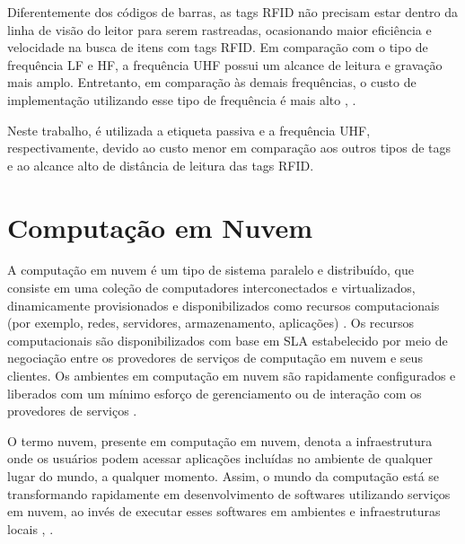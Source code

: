 
Diferentemente dos códigos de barras, as tags \acrshort{RFID} não precisam estar dentro da linha de visão do leitor para serem rastreadas, ocasionando maior eficiência e velocidade na busca de itens com tags \acrshort{RFID}. Em comparação com o tipo de frequência \acrshort{LF} e \acrshort{HF}, a frequência \acrshort{UHF} possui um alcance de leitura e gravação mais amplo. Entretanto, em comparação às demais frequências, o custo de implementação utilizando esse tipo de frequência é mais alto \cite{Bolic2010}, \cite{Juels2006RFIDSurvey}.

Neste trabalho, é utilizada a etiqueta passiva e a frequência \acrshort{UHF}, respectivamente, devido ao custo menor em comparação aos outros tipos de tags e ao alcance alto de distância de leitura das tags \acrshort{RFID}.

\section{Computação em Nuvem}
\label{sec:computação-nuvem}




A computação em nuvem é um tipo de sistema paralelo e distribuído, que consiste em uma coleção de computadores interconectados e virtualizados, dinamicamente provisionados e disponibilizados como recursos computacionais (por exemplo, redes, servidores, armazenamento, aplicações) \cite{Buyya2009}. Os recursos computacionais são disponibilizados com base em \acrshort{SLA} estabelecido por meio de negociação entre os provedores de serviços de computação em nuvem e seus clientes. Os ambientes em computação em nuvem são rapidamente configurados e liberados com um mínimo esforço de gerenciamento ou de interação com os provedores de serviços \cite{Zhang2010}.

O termo nuvem, presente em computação em nuvem, denota a infraestrutura onde os usuários podem acessar aplicações incluídas no ambiente de qualquer lugar do mundo, a qualquer momento. Assim, o mundo da computação está se transformando rapidamente em desenvolvimento de softwares utilizando serviços em nuvem, ao invés de executar esses softwares em ambientes e infraestruturas locais \cite{Zhang2010}, \cite{Jadeja2012}. 

